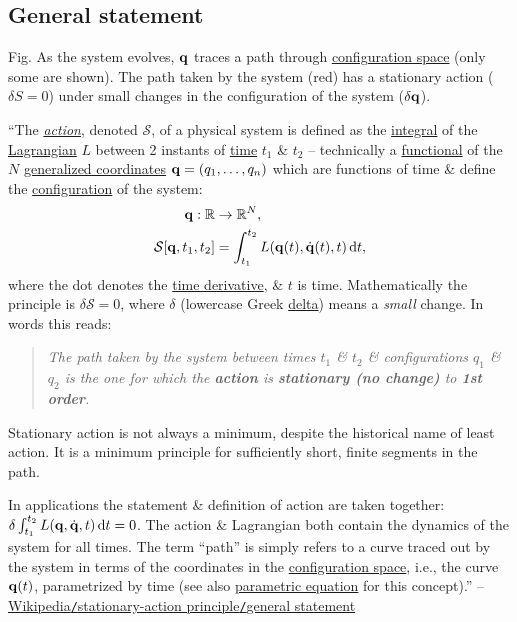\documentclass[oneside]{book}
\numberwithin{equation}{section}
\begin{document}
\subsection{General statement}
\textsf{Fig. As the system evolves, ${\bf q}$ traces a path through \href{https://en.wikipedia.org/wiki/Configuration_space_(physics)}{configuration space} (only some are shown). The path taken by the system (red) has a stationary action ($\delta S = 0$) under small changes in the configuration of the system ($\delta{\bf q}$).}

``The \href{https://en.wikipedia.org/wiki/Action_(physics)}{\textit{action}}, denoted $\mathcal{S}$, of a physical system is defined as the \href{https://en.wikipedia.org/wiki/Integral_(mathematics)}{integral} of the \href{https://en.wikipedia.org/wiki/Lagrangian_mechanics}{Lagrangian} $L$ between 2 instants of \href{https://en.wikipedia.org/wiki/Time_in_physics}{time} $t_1$ \& $t_2$ -- technically a \href{https://en.wikipedia.org/wiki/Functional_(mathematics)}{functional} of the $N$ \href{https://en.wikipedia.org/wiki/Generalized_coordinates}{generalized coordinates} ${\bf q} = (q_1,\ldots,q_n)$ which are functions of time \& define the \href{https://en.wikipedia.org/wiki/Configuration_space_(physics)}{configuration} of the system:
\begin{align*}
	{\bf q}:\mathbb{R}&\to\mathbb{R}^N,\\
	\mathcal{S}[{\bf q},t_1,t_2] &= \int_{t_1}^{t_2} L({\bf q}(t),\dot{\bf q}(t),t)\,{\rm d}t,
\end{align*}
where the dot denotes the \href{https://en.wikipedia.org/wiki/Time_derivative}{time derivative}, \& $t$ is time. Mathematically the principle is $\delta\mathcal{S} = 0$, where $\delta$ (lowercase Greek \href{https://en.wikipedia.org/wiki/Delta_(letter)}{delta}) means a \textit{small} change. In words this reads:
\begin{quotation}
	\textit{The path taken by the system between times $t_1$ \& $t_2$ \& configurations $q_1$ \& $q_2$ is the one for which the \textbf{action} is \textbf{stationary (no change)} to \textbf{1st order}.}
\end{quotation}
Stationary action is not always a minimum, despite the historical name of least action. It is a minimum principle for sufficiently short, finite segments in the path.

In applications the statement \& definition of action are taken together: $\delta\int_{t_1}^{t_2} L({\bf q},\dot{\bf q},t)\,{\rm d}t = 0$. The action \& Lagrangian both contain the dynamics of the system for all times. The term ``path'' is simply refers to a curve traced out by the system in terms of the coordinates in the \href{https://en.wikipedia.org/wiki/Configuration_space_(physics)}{configuration space}, i.e., the curve ${\bf q}(t)$, parametrized by time (see also \href{https://en.wikipedia.org/wiki/Parametric_equation}{parametric equation} for this concept).'' -- \href{https://en.wikipedia.org/wiki/Stationary-action_principle#General_statement}{Wikipedia\texttt{/}stationary-action principle\texttt{/}general statement}
\end{document}
